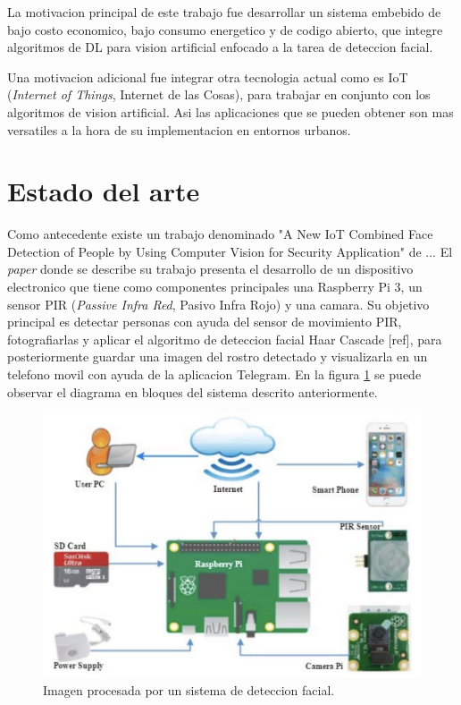 La motivacion principal de este trabajo fue desarrollar un sistema embebido de bajo costo economico, bajo consumo energetico y de codigo abierto, que integre algoritmos de DL para vision artificial enfocado a la tarea de deteccion facial.

Una motivacion adicional fue integrar otra tecnologia actual como es IoT (\textit{Internet of Things}, Internet de las Cosas), para trabajar en conjunto con los algoritmos de vision artificial. Asi las aplicaciones que se pueden obtener son mas versatiles a la hora de su implementacion en entornos urbanos. 

\section{Estado del arte}
Como antecedente existe un trabajo denominado "A New IoT Combined Face Detection of People by Using Computer Vision for Security Application" de ... El \textit{paper} donde se describe su trabajo presenta el desarrollo de un dispositivo electronico que tiene como componentes principales una Raspberry Pi 3, un sensor PIR (\textit{Passive Infra Red}, Pasivo Infra Rojo) y una camara. Su objetivo principal es detectar personas con ayuda del sensor de movimiento PIR, fotografiarlas y aplicar el algoritmo de deteccion facial Haar Cascade [ref], para posteriormente guardar una imagen del rostro detectado y visualizarla en un telefono movil con ayuda de la aplicacion Telegram. En la figura \ref{fig:soa_arch} se puede observar el diagrama en bloques del sistema descrito anteriormente.

\begin{figure}[h]
	\centering
	\includegraphics[scale=0.3]{./Figures/soa_arch.png}
	\caption{Imagen procesada por un sistema de deteccion facial.}
	\label{fig:soa_arch}
\end{figure}

